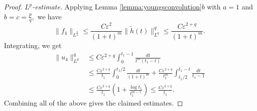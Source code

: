 \documentclass[12pt]{amsart}
\renewcommand{\1}{{\mathbf 1}}
\newcommand{\eps}{{\varepsilon}}
\theoremstyle{others}
\numberwithin{equation}{section}
\begin{document}
\begin{proof}
   \noindent \emph{$L^p$-estimate.} Applying Lemma \ref{lemma:youngsconvolution}$b$ with $a = 1$ and $b = c = \frac{p}{q},$ we have
   \begin{equation*}
       \|f_4 \|_{L^{\frac{p}{q}}} \leq \frac{C \eps^{2}}{(1 + t)^m} \|\tilde{h}(t) \|_{L^q}^q \leq \frac{C \eps^{2 + q}}{(1 + t)^m}.
   \end{equation*}
   Integrating, we get
   \begin{equation}
   \begin{split}
            \|u_4 \|_{L^p}^q & \leq C \eps^{2 + q} \int_0^{t_1 - 1} \frac{dt}{t^m (t_1 - t) } \\
            & \leq \frac{C \eps^{2 + q}}{t_1} \int_0^{t_1/2} \frac{dt}{(1 + t)^m} + \frac{C \eps^{2 + q}}{t_1^m} \int_{t_1/2}^{t_1 - t} \frac{dt}{t_1 - 1} \\
            & \leq \frac{C \eps^{2 + q}}{t_1} \left( 1 + \frac{\log t_1}{t_1^{m-1}} \right) \leq  \frac{C \eps^{2 + q}}{t_1}.
            \end{split}
        \end{equation}
Combining all of the above gives the claimed estimates.
\end{proof}
    








\end{document}
